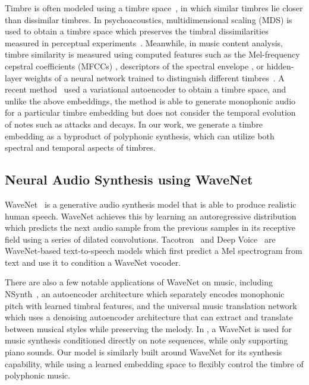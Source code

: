 Timbre is often modeled using a timbre space~\cite{peeters2011timbre}, in which similar timbres lie closer than dissimilar timbres.
In psychoacoustics, multidimensional scaling (MDS) is used to obtain a timbre space which preserves the timbral dissimilarities measured in perceptual experiments~\cite{grey1977multidimensional,wessel1979timbre}.
Meanwhile, in music content analysis, timbre similarity is measured using computed features such as the Mel-frequency cepstral coefficients (MFCCs) \cite{logan2000mfcc},
descriptors of the spectral envelope \cite{agostini2003musical}, or hidden-layer weights of a neural network trained to distinguish different timbres~\cite{humphrey2011nlse}.
A recent method~\cite{esling2018timbrevae} used a variational autoencoder \cite{kingma2014vae} to obtain a timbre space, and unlike the above embeddings, the method is able to generate monophonic audio for a particular timbre embedding but does not consider the temporal evolution of notes such as attacks and decays.
In our work, we generate a timbre embedding as a byproduct of polyphonic synthesis, which can utilize both spectral and temporal aspects of timbres.


\subsection{Neural Audio Synthesis using WaveNet}

WaveNet~\cite{oord2016wavenet} is a generative audio synthesis model that is able to produce realistic human speech.
WaveNet achieves this by learning an autoregressive distribution which predicts the next audio sample from the previous samples in its receptive field using a series of dilated convolutions.
Tacotron~\cite{shen2018tacotron} and Deep Voice~\cite{ping2018deepvoice} are WaveNet-based text-to-speech models which first predict a Mel spectrogram from text and use it to condition a WaveNet vocoder.

There are also a few notable applications of WaveNet on music, including NSynth~\cite{engel2017neural}, an autoencoder architecture which separately encodes monophonic pitch with learned timbral features, and the universal music translation network~\cite{mor2018universal} which uses a denoising autoencoder architecture that can extract and translate between musical styles while preserving the melody.
In \cite{anonymous2019maestro}, a WaveNet is used for music synthesis conditioned directly on note sequences, while only supporting piano sounds.
Our model is similarly built around WaveNet for its synthesis capability, while using a learned embedding space to flexibly control the timbre of polyphonic music.


